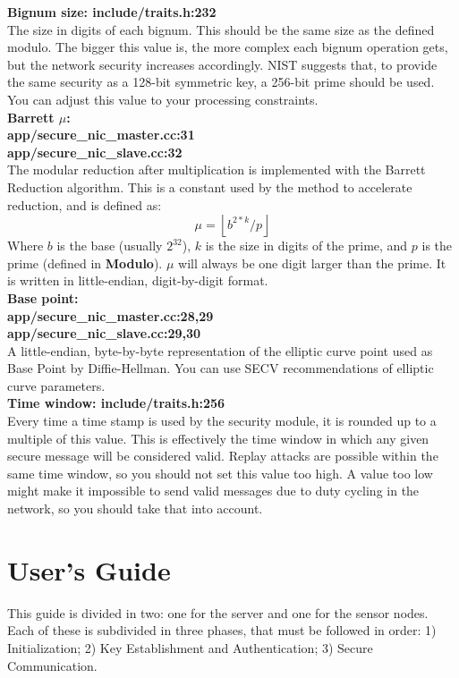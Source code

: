 \documentclass[a4paper,10pt]{article}   %
\begin{document}
		\textbf{Bignum size: include/traits.h:232} \\
		\indent The size in digits of each bignum. This should be the same size as the defined modulo. The bigger this value is, the more complex each bignum operation gets, but the network security increases accordingly. NIST suggests \cite{NSA} that, to provide the same security as a 128-bit symmetric key, a 256-bit prime should be used. You can adjust this value to your processing constraints.\\
		
		\textbf{Barrett $\mu$:\\app/secure\_nic\_master.cc:31\\app/secure\_nic\_slave.cc:32} \\
		\indent The modular reduction after multiplication is implemented with the Barrett Reduction \cite{Brown:2001} algorithm. This is a constant used by the method to accelerate reduction, and is defined as:
		\begin{equation}
			\mu = \left \lfloor b^{2*k} / p \right \rfloor
		\end{equation}
		Where $b$ is the base (usually $2^{32}$), $k$ is the size in digits of the prime, and $p$ is the prime (defined in \textbf{Modulo}). $\mu$ will always be one digit larger than the prime. It is written in little-endian, digit-by-digit format.\\

		\textbf{Base point:\\app/secure\_nic\_master.cc:28,29\\app/secure\_nic\_slave.cc:29,30} \\
		\indent A little-endian, byte-by-byte representation of the elliptic curve point used as Base Point by Diffie-Hellman. You can use SECV \cite{SECV2} recommendations of elliptic curve parameters.\\

		\textbf{Time window: include/traits.h:256} \\
		\indent Every time a time stamp is used by the security module, it is rounded up to a multiple of this value. This is effectively the time window in which any given secure message will be considered valid. Replay attacks are possible within the same time window, so you should not set this value too high. A value too low might make it impossible to send valid messages due to duty cycling in the network, so you should take that into account.\\


\section{User's Guide}
	This guide is divided in two: one for the server and one for the sensor nodes. Each of these is subdivided in three phases, that must be followed in order: 1) Initialization; 2) Key Establishment and Authentication; 3) Secure Communication.
\end{document}

